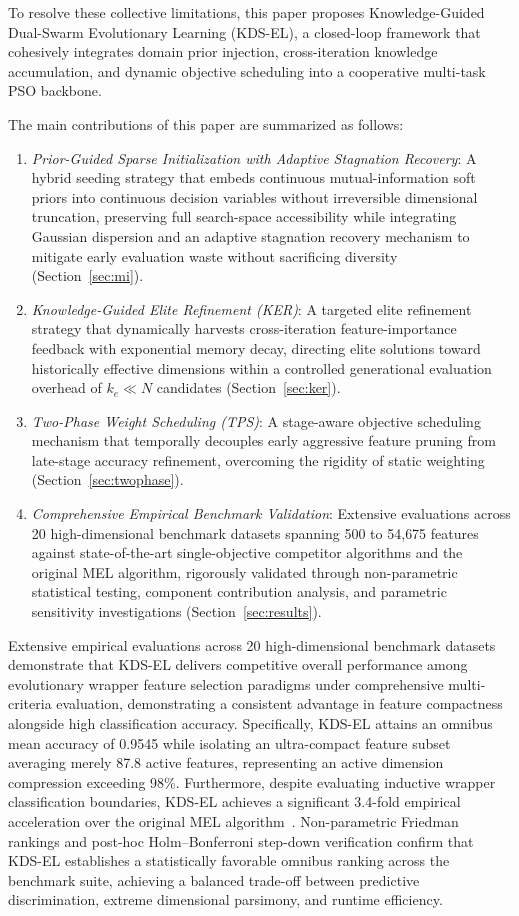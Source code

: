 To resolve these collective limitations, this paper proposes Knowledge-Guided Dual-Swarm Evolutionary Learning (KDS-EL), a closed-loop framework that cohesively integrates domain prior injection, cross-iteration knowledge accumulation, and dynamic objective scheduling into a cooperative multi-task PSO backbone.

The main contributions of this paper are summarized as follows:
\begin{enumerate}
\item \textit{Prior-Guided Sparse Initialization with Adaptive Stagnation Recovery}: A hybrid seeding strategy that embeds continuous mutual-information soft priors into continuous decision variables without irreversible dimensional truncation, preserving full search-space accessibility while integrating Gaussian dispersion and an adaptive stagnation recovery mechanism to mitigate early evaluation waste without sacrificing diversity (Section~\ref{sec:mi}).
\item \textit{Knowledge-Guided Elite Refinement (KER)}: A targeted elite refinement strategy that dynamically harvests cross-iteration feature-importance feedback with exponential memory decay, directing elite solutions toward historically effective dimensions within a controlled generational evaluation overhead of $k_e \ll N$ candidates (Section~\ref{sec:ker}).
\item \textit{Two-Phase Weight Scheduling (TPS)}: A stage-aware objective scheduling mechanism that temporally decouples early aggressive feature pruning from late-stage accuracy refinement, overcoming the rigidity of static weighting (Section~\ref{sec:twophase}).
\item \textit{Comprehensive Empirical Benchmark Validation}: Extensive evaluations across 20 high-dimensional benchmark datasets spanning 500 to 54{,}675 features against state-of-the-art single-objective competitor algorithms and the original MEL algorithm, rigorously validated through non-parametric statistical testing, component contribution analysis, and parametric sensitivity investigations (Section~\ref{sec:results}).
\end{enumerate}

Extensive empirical evaluations across 20 high-dimensional benchmark datasets demonstrate that KDS-EL delivers competitive overall performance among evolutionary wrapper feature selection paradigms under comprehensive multi-criteria evaluation, demonstrating a consistent advantage in feature compactness alongside high classification accuracy. Specifically, KDS-EL attains an omnibus mean accuracy of 0.9545 while isolating an ultra-compact feature subset averaging merely 87.8 active features, representing an active dimension compression exceeding 98\%. Furthermore, despite evaluating inductive wrapper classification boundaries, KDS-EL achieves a significant 3.4-fold empirical acceleration over the original MEL algorithm~\cite{mel2024}. Non-parametric Friedman rankings and post-hoc Holm--Bonferroni step-down verification confirm that KDS-EL establishes a statistically favorable omnibus ranking across the benchmark suite, achieving a balanced trade-off between predictive discrimination, extreme dimensional parsimony, and runtime efficiency.

